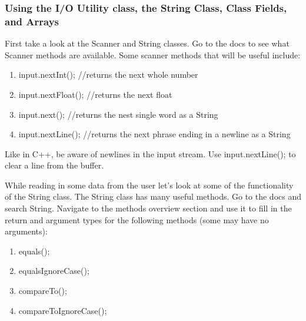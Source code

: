\documentclass[../../main.tex]{subfiles}
\begin{document}
\subsubsection{Using the I/O Utility class, the String Class, Class Fields, and Arrays}
\begin{steps}
      \item First take a look at the Scanner and String classes. 
         Go to the docs to see what Scanner methods are available.
         Some scanner methods that will be useful include: 
   \begin{enumerate}[label=\Alph*.]
      \item input.nextInt();     //returns the next whole number
      \item input.nextFloat();   //returns the next float
      \item input.next();        //returns the nest single word as a String
      \item input.nextLine();    //returns the next phrase ending in a newline as a String
   \end{enumerate}
      \item Like in C++, be aware of newlines in the input stream.
         Use input.nextLine(); to clear a line from the buffer.
      \item While reading in some data from the user let's look at some of the functionality of
         the String class. The String class has many useful methods. Go to the docs and search
         String. Navigate to the methods overview section and use it to fill in the return and
         argument types for the following methods (some may have no arguments):
   \begin{enumerate}[label=\Alph*.]
      \item \vspace{.5cm}\underline{\hspace{4cm}}equals(\underline{\hspace{4cm}});
      \item \vspace{.5cm}\underline{\hspace{4cm}}equalsIgnoreCase(\underline{\hspace{4cm}});
      \item \vspace{.5cm}\underline{\hspace{4cm}}compareTo(\underline{\hspace{4cm}});
      \item \vspace{.5cm}\underline{\hspace{4cm}}compareToIgnoreCase(\underline{\hspace{4cm}});

\end{enumerate}
\end{steps}
\end{document}

